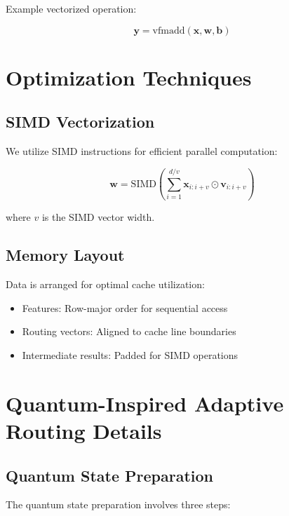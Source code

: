 \documentclass[10pt]{article}
\begin{document}
Example vectorized operation:

\begin{equation}
    \mathbf{y} = \text{vfmadd}(\mathbf{x}, \mathbf{w}, \mathbf{b})
\end{equation}

\section{Optimization Techniques}

\subsection{SIMD Vectorization}
We utilize SIMD instructions for efficient parallel computation:

\begin{equation}
    \mathbf{w} = \text{SIMD}\left(\sum_{i=1}^{d/v} \mathbf{x}_{i:i+v} \odot \mathbf{v}_{i:i+v}\right)
\end{equation}

where $v$ is the SIMD vector width.

\subsection{Memory Layout}
Data is arranged for optimal cache utilization:

\begin{itemize}
    \item Features: Row-major order for sequential access
    \item Routing vectors: Aligned to cache line boundaries
    \item Intermediate results: Padded for SIMD operations
\end{itemize}

\section{Quantum-Inspired Adaptive Routing Details}

\subsection{Quantum State Preparation}
The quantum state preparation involves three steps:
\end{document}
